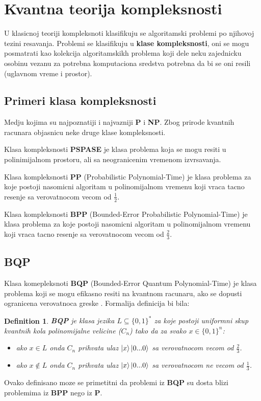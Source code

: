 \documentclass[12pt, letterpaper, oneside]{article}
\newtheorem{definition}{Definition}
\begin{document}
\section{Kvantna teorija kompleksnosti}
U klasicnoj teoriji kompleksnoti klasifikuju se algoritamski problemi po njihovoj tezini resavanja.
Problemi se klasifikuju u \textbf{klase kompleksnosti}, oni se mogu posmatrati kao kolekcija algoritamskikh problema koji dele neku zajednicku osobinu
vezanu za potrebna komputaciona sredstva potrebna da bi se oni resili (uglavnom vreme i prostor). \cite{nielsen_chuang_10th}\\

\subsection{Primeri klasa kompleksnosti}
Medju kojima su najpoznatiji i najvazniji \textbf{P} i \textbf{NP}. Zbog prirode kvantnih racunara objasnicu neke druge klase kompleksnosti.

Klasa kompleksnosti \textbf{PSPASE} je klasa problema koja se mogu resiti u polinimijalnom prostoru, ali sa neogranicenim vremenom izvrsavanja.


Klasa kompleksnosti \textbf{PP} (Probabilistic Polynomial-Time) je klasa problema za koje postoji nasomicni algoritam u polinomijalnom vremenu koji vraca
tacno resenje sa verovatnocom vecom od $\frac{1}{2}$.

Klasa kompleksnosti \textbf{BPP} (Bounded-Error Probabilistic Polynomial-Time) je klasa problema za koje postoji nasomicni algoritam u polinomijalnom vremenu koji vraca
tacno resenje sa verovatnocom vecom od $\frac{2}{3}$. \cite{aaronson2013quantum}
\subsection{BQP}
Klasa komepleksnoti \textbf{BQP} (Bounded-Error Quantum Polynomial-Time) je klasa problema koji se mogu efikasno resiti na kvantnom racunaru, ako se dopusti ogranicena verovatnoca greske \cite{nielsen_chuang_10th}.
Formalija definicija bi bila:\cite{aaronson2013quantum}
\begin{definition}
    \textbf{BQP} je klasa jezika $L \subseteq \{0,1\}^{*}$ za koje postoji uniformni skup kvantnih kola polinomijalne velicine ($C_n$)
    tako da za svako $x \in \{0,1\}^{n}$:
    \begin{itemize}
        \item ako $x \in L$ onda $C_n$ prihvata ulaz $\Ket{x}\Ket{0...0}$ sa verovatnocom vecom od $\frac{2}{3}$.
        \item ako $x \notin L$ onda $C_n$ prihvata ulaz $\Ket{x}\Ket{0...0}$ sa verovatnocom ne vecom od $\frac{1}{3}$.
    \end{itemize} 
\end{definition}
Ovako definisano moze se primetitni da problemi iz \textbf{BQP} su dosta blizi problemima iz \textbf{BPP} nego iz \textbf{P}.
\end{document}
